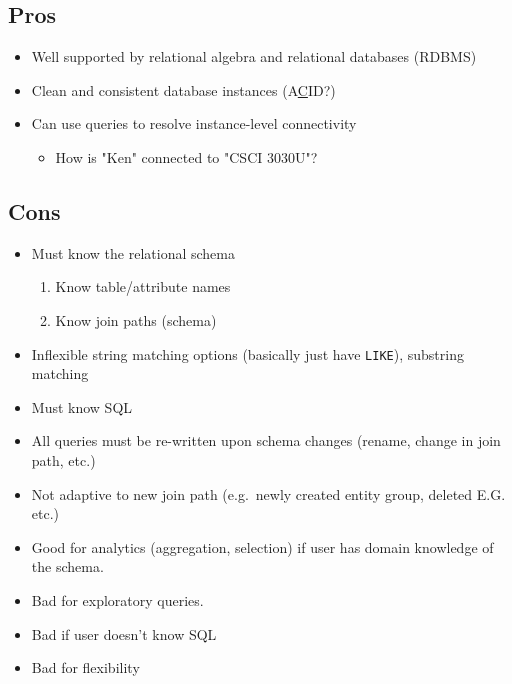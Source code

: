 	\subsection{Pros}
		\begin{itemize}
			\item Well supported by relational algebra and relational databases (RDBMS)
			\item Clean and consistent database instances (A\underline{C}ID?)
			\item Can use queries to resolve instance-level connectivity
				\begin{itemize}
					\item How is "Ken" connected to "CSCI 3030U"?
				\end{itemize}
		\end{itemize}
	
	\subsection{Cons}
		\begin{itemize}
			\item Must know the relational schema
				\begin{enumerate}
					\item Know table/attribute names
					\item Know join paths (schema)
				\end{enumerate}
			\item Inflexible string matching options  (basically just have \texttt{LIKE}), substring matching
			\item Must know SQL
			\item All queries must be re-written upon schema changes (rename, change in join path, etc.)
			\item Not adaptive to new join path (e.g.\ newly created entity group, deleted E.G.\, etc.)
		\end{itemize}

	\begin{itemize}
		\item Good for analytics (aggregation, selection) if user has domain knowledge of the schema.
		\item Bad for exploratory queries.
		\item Bad if user doesn't know SQL
		\item Bad for flexibility
	\end{itemize}

